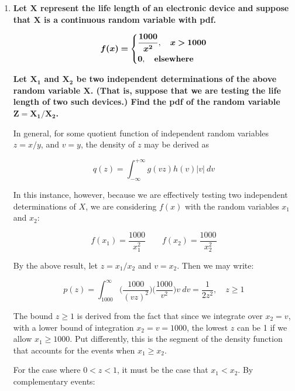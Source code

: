 \documentclass[10pt, oneside]{article}
\begin{document}
\begin{enumerate}[label=6.\arabic*]
Clearly $p(a) \geq 0$ and integrating $p(a)$ piecewise across the respective bounds yields unity, satisfying the Kolmogorov axioms and ascertaining that $p(a)$ is a pdf. I leave the details of that calculation to the reader.

\item  \begin{tcolorbox}[
  colback=Cerulean!5!white,
  colframe=Cerulean!75!black]
\textbf{Let $\bm{X}$ represent the life length of an electronic device and suppose that $\bm{X}$ is a continuous random variable with pdf.}

\[
\bm{f(x) =} \begin{dcases}
\bm{\frac{1000}{x^2}}, \quad \bm{x > 1000} \\
\bm{0}, \quad \textbf{elsewhere}
\end{dcases}
\]

\textbf{Let $\bm{X_1}$ and $\bm{X_2}$ be two independent determinations of the above random variable $\bm{X}$. (That is, suppose that we are testing the life length of two such devices.) Find the pdf of the random variable $\bm{Z = X_1 / X_2}$.}
\end{tcolorbox}

In general, for some quotient function of independent random variables $z = x/y$, and $v = y$, the density of $z$ may be derived as

\[ q(z) = \int^{+\infty}_{-\infty} g(vz) h(v) |v| \ dv \]

In this instance, however, because we are effectively testing two independent determinations of $X$, we are considering $f(x)$ with the random variables $x_1$ and $x_2$:

\[ f(x_1) = \frac{1000}{x_1^2} \qquad f(x_2) = \frac{1000}{x_2^2} \]

By the above result, let $z = x_1 / x_2$ and $v = x_2$. Then we may write:

\[ p(z) = \int^\infty_{1000} \Big( \frac{1000}{(vz)^2} \Big) \Big( \frac{1000}{v^2} \Big) v \ dv = \boxed{\frac{1}{2z^2}, \quad z \geq 1} \]

The bound $z \geq 1$ is derived from the fact that since we integrate over $x_2 = v$, with a lower bound of integration $x_2 = v = 1000$, the lowest $z$ can be 1 if we allow $x_1 \geq 1000$. Put differently, this is the segment of the density function that accounts for the events when $x_1 \geq x_2$.

For the case where $0 < z < 1$, it must be the case that $x_1 < x_2$. By complementary events:


\end{enumerate}
\end{document}
